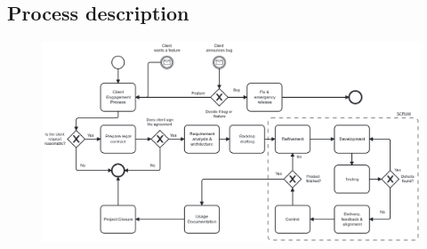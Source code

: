



\begin{landscape}
\section{Process description}
\thispagestyle{empty}
\begin{figure}[H]%
    \centering
    \includegraphics[width=\linewidth]{etc/diagram.png}
\end{figure}
\end{landscape}
%     
%     



